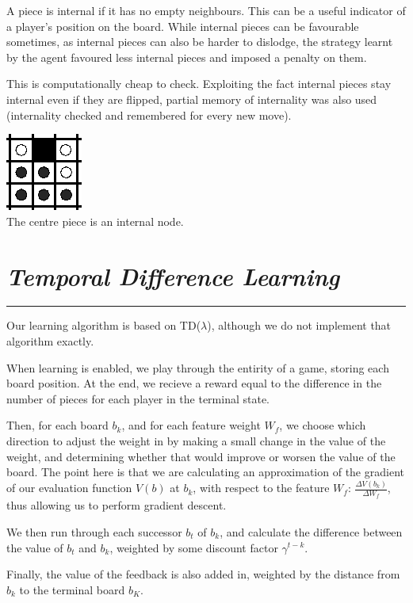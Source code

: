 \documentclass[10pt]{report}
\begin{document}
\begin{multicols}{2}
A piece is internal if it has no empty neighbours. This can be a useful indicator of a player's position on the board. While internal pieces can be favourable sometimes, as internal pieces can also be harder to dislodge, the strategy learnt by the agent favoured less internal pieces and imposed a penalty on them.

This is computationally cheap to check. Exploiting the fact internal pieces stay internal even if they are flipped, partial memory of internality was also used (internality checked and remembered for every new move).

\begin{center}
\includegraphics[scale=0.50]{internality.PNG}\\
The centre piece is an internal node.
\end{center}
\section*{\emph{Temporal Difference Learning}}
\hrule

Our learning algorithm is based on TD($\lambda$), although we do not implement that algorithm exactly.

When learning is enabled, we play through the entirity of a game, storing each board position. At the end, we recieve a reward equal to the difference in the number of pieces for each player in the terminal state.

Then, for each board $b_k$, and for each feature weight $W_f$, we choose which direction to adjust the weight in by making a small change in the value of the weight, and determining whether that would improve or worsen the value of the board. The point here is that we are calculating an approximation of the gradient of our evaluation function $V(b)$ at $b_k$, with respect to the feature $W_f$: $\frac{\Delta V(b_k)}{\Delta W_f}$, thus allowing us to perform gradient descent.

We then run through each successor $b_t$ of $b_k$, and calculate the difference between the value of $b_t$ and $b_k$, weighted by some discount factor $\gamma^{t-k}$.

Finally, the value of the feedback is also added in, weighted by the distance from $b_k$ to the terminal board $b_K$.


\end{multicols}
\end{document}
